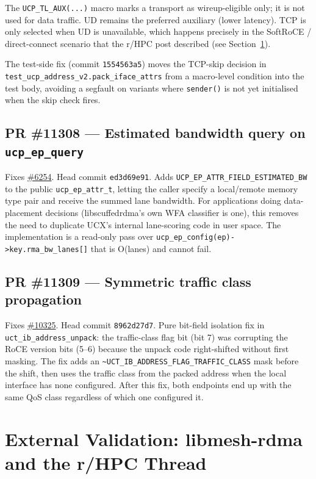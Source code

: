 \documentclass[11pt]{article}
\begin{document}
The \texttt{UCP\_TL\_AUX(...)} macro marks a transport as
wireup-eligible only; it is not used for data traffic. UD remains the
preferred auxiliary (lower latency). TCP is only selected when UD is
unavailable, which happens precisely in the SoftRoCE / direct-connect
scenario that the r/HPC post described (see
Section~\ref{sec:reddit}).

The test-side fix (commit \texttt{1554563a5}) moves the TCP-skip
decision in \texttt{test\_ucp\_address\_v2.pack\_iface\_attrs} from a
macro-level condition into the test body, avoiding a segfault on
variants where \texttt{sender()} is not yet initialised when the skip
check fires.

\subsection{PR \#11308 --- Estimated bandwidth query on \texttt{ucp\_ep\_query}}
\label{sec:pr_11308}

Fixes \href{https://github.com/openucx/ucx/issues/6254}{\#6254}. Head
commit \texttt{ed3d69e91}. Adds \texttt{UCP\_EP\_ATTR\_FIELD\_ESTIMATED\_BW}
to the public \texttt{ucp\_ep\_attr\_t}, letting the caller specify a
local/remote memory type pair and receive the summed lane bandwidth.
For applications doing data-placement decisions (libscuffedrdma's own
WFA classifier is one), this removes the need to duplicate UCX's
internal lane-scoring code in user space. The implementation is a
read-only pass over \texttt{ucp\_ep\_config(ep)->key.rma\_bw\_lanes[]}
that is O(lanes) and cannot fail.

\subsection{PR \#11309 --- Symmetric traffic class propagation}
\label{sec:pr_11309}

Fixes \href{https://github.com/openucx/ucx/issues/10325}{\#10325}. Head
commit \texttt{8962d27d7}. Pure bit-field isolation fix in
\texttt{uct\_ib\_address\_unpack}: the traffic-class flag bit (bit 7)
was corrupting the RoCE version bits (5--6) because the unpack code
right-shifted without first masking. The fix adds an
\texttt{\textasciitilde UCT\_IB\_ADDRESS\_FLAG\_TRAFFIC\_CLASS} mask
before the shift, then uses the traffic class from the packed address
when the local interface has none configured. After this fix, both
endpoints end up with the same QoS class regardless of which one
configured it.

\section{External Validation: libmesh-rdma and the r/HPC Thread}
\label{sec:reddit}
\end{document}
